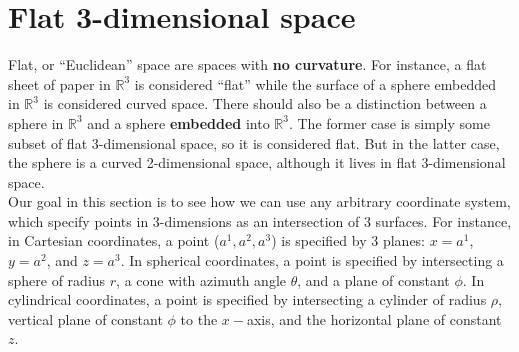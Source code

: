 \documentclass{article}
\theoremstyle{definition}
\begin{document}
\section{Flat 3-dimensional space}
Flat, or ``Euclidean'' space are spaces with \textbf{no curvature}. For instance, a flat sheet of paper in $\mathbb{R}^3$ is considered ``flat'' while the surface of a sphere embedded in $\mathbb{R}^3$ is considered curved space. There should also be a distinction between a sphere in $\mathbb{R}^3$ and a sphere \textbf{embedded} into $\mathbb{R}^3$. The former case is simply some subset of flat 3-dimensional space, so it is considered flat. But in the latter case, the sphere is a curved 2-dimensional space, although it lives in flat 3-dimensional space.\\

Our goal in this section is to see how  we can use any arbitrary coordinate system, which specify points in 3-dimensions as an intersection of 3 surfaces. For instance, in Cartesian coordinates, a point ($a^1,a^2,a^3$) is specified by 3 planes: $x = a^1$, $y=a^2$, and $z=a^3$. In spherical coordinates, a point is specified by intersecting a sphere of radius $r$, a cone with azimuth angle $\theta$, and a plane of constant $\phi$. In cylindrical coordinates, a point is specified by intersecting a cylinder of radius $\rho$, vertical plane of constant $\phi$ to the $x-$axis, and the horizontal plane of constant $z$.
\end{document}
